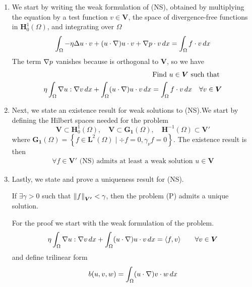 \begin{enumerate}
    \item We start by writing the weak formulation of (NS), obtained by multiplying the equation by a test function \(v \in \bm{V}\), the space of divergence-free functions in \(\bm{H}^1_0(\Omega)\), and integrating over \(\Omega\)
    \[
    \begin{split}
        \int_\Omega -\eta \Delta u \cdot v + (u \cdot \nabla) u \cdot v + \nabla p \cdot v \, dx = \int_\Omega f \cdot v \, dx
    \end{split}
    \]
    The term \(\nabla p\) vanishes because is orthogonal to \(\bm{V}\), so we have
    \[
    \begin{split}
        \text{Find } u \in \bm{V} \text{ such that } \\
        \eta \int_\Omega \nabla u : \nabla v \, dx + \int_\Omega (u \cdot \nabla) u \cdot v \, dx = \int_\Omega f \cdot v \, dx \quad \forall v \in \bm{V}
    \end{split}
    \]
    \item Next, we state an existence result for weak solutions to (NS).We start by defining the Hilbert spaces needed for the problem
    \[
        \bm{V} \subset \bm{H}^1_0(\Omega), \quad \bm{V} \subset \bm{G_1}(\Omega), \quad \bm{H}^{-1}(\Omega) \subset \bm{V'}
    \]
    where \(\bm{G_1}(\Omega) = \left\{f \in \bm{L}^2(\Omega) \mid \div f = 0, \gamma_\nu f = 0 \right\}\). The existence result is then
    \[
        \begin{split}
            \forall f \in \bm{V'} \text{ (NS) admits at least a weak solution } u \in \bm{V} 
        \end{split}
    \]
    \item Lastly, we state and prove a uniqueness result for (NS). 
    \begin{remark}
        If \(\exists \gamma > 0\) such that \(\norm{f}_{\bm{V'}} < \gamma\), then the problem (P) admits a unique solution.
    \end{remark}
    For the proof we start with the weak formulation of the problem. 
    \[
        \begin{split}
            \eta \int_\Omega \nabla u : \nabla v \, dx + \int_\Omega (u \cdot \nabla) u \cdot v \, dx = \langle f, v \rangle \qquad \forall v \in \bm{V}
        \end{split}
    \]
    and define trilinear form
    \[
        \begin{split}
            b(u, v, w) = \int_\Omega (u \cdot \grad) v \cdot w \, dx

\end{split}\]
\end{enumerate}
